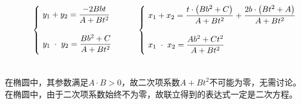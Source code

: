\documentclass[UTF8]{ctexart}
\begin{document}
    \begin{large}
        \begin{equation*}
            ~~~~~~~~~~\begin{cases}
                ~y_1+y_2=\dfrac{-2Bbt}{A+Bt^2}\\[6mm]
                ~y_1\hspace{3.0pt}\cdot\hspace{3.0pt}y_2=\dfrac{Bb^2+C}{A+Bt^2}\\[2mm]
            \end{cases}~~~~~~
            \begin{cases}
                ~x_1+x_2=\dfrac{t\cdot\left(Bb^2+C\right)}{A+Bt^2}+\dfrac{2b\cdot\left(Bt^2+A\right)}{A+Bt^2}\\[6mm]
                ~x_1\hspace{3.0pt}\cdot\hspace{3.0pt}x_2=\dfrac{Ab^2+Ct^2}{A+Bt^2}\\[2mm]
            \end{cases}
        \end{equation*}
    \end{large}\\[3mm]
    在椭圆中，其参数满足$A\cdot B>0$，故二次项系数$A+Bt^2$不可能为零，无需讨论。\\[3mm]
    在椭圆中，由于二次项系数始终不为零，故联立得到的表达式一定是二次方程。
    
\newpage
\end{document}
